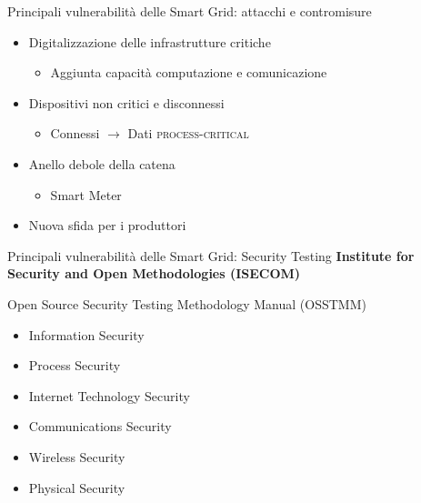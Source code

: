 

\begin{frame}{Principali vulnerabilità delle Smart Grid: attacchi e contromisure}
	\begin{itemize}[<+- | alert@+>]
		\item Digitalizzazione delle infrastrutture critiche
		\begin{itemize}
			\item Aggiunta capacità computazione e comunicazione
		\end{itemize}
		\item Dispositivi non critici e disconnessi
		\begin{itemize}
			\item Connessi $\rightarrow$ Dati \textsc{process-critical}
		\end{itemize}
		\item Anello debole della catena
		\begin{itemize}
			\item Smart Meter
		\end{itemize}
		\item Nuova sfida per i produttori
	\end{itemize}
\end{frame}



\begin{frame}{Principali vulnerabilità delle Smart Grid: Security Testing}
		\textbf{Institute for Security and Open Methodologies (ISECOM)}
		\begin{block}{Open Source Security Testing Methodology Manual (OSSTMM)}
			\begin{itemize}
				\item Information Security
				\item Process Security
				\item \alert<9>{Internet Technology Security}
				\item Communications Security
				\item Wireless Security
				\item Physical Security
			\end{itemize}
			\end{block}
\end{frame}

